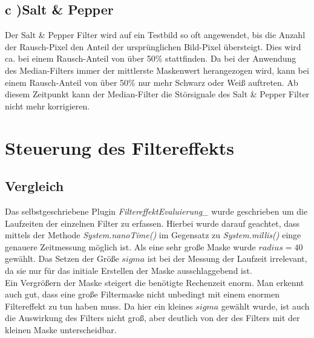 \documentclass[12pt,german]{article}
\begin{document}
\subsection{c )Salt \& Pepper}
Der Salt \& Pepper Filter wird auf ein Testbild so oft angewendet, bis die Anzahl der Rausch-Pixel den Anteil der ursprünglichen Bild-Pixel übersteigt. Dies wird ca. bei einem Rausch-Anteil von über 50\% stattfinden. Da bei der Anwendung des Median-Filters immer der mittlerste Maskenwert herangezogen wird, kann bei einem Rausch-Anteil von über 50\% nur mehr Schwarz oder Weiß auftreten. Ab diesem Zeitpunkt kann der Median-Filter die Störsignale des Salt \& Pepper Filter nicht mehr korrigieren.



\newpage
\section{Steuerung des Filtereffekts }

\subsection{Vergleich}
Das selbstgeschriebene Plugin \textit{FiltereffektEvaluierung\_} wurde geschrieben um die Laufzeiten der einzelnen Filter zu erfassen. Hierbei wurde darauf geachtet, dass mittels der Methode \textit{System.nanoTime()} im Gegensatz zu \textit{System.millis()} einge genauere Zeitmessung möglich ist. Als eine sehr große Maske wurde $  radius = 40 $ gewählt. Das Setzen der Größe $ sigma $ ist bei der Messung der Laufzeit irrelevant, da sie nur für das initiale Erstellen der Maske ausschlaggebend ist. \\

Ein Vergrößern der Maske steigert die benötigte Rechenzeit enorm. Man erkennt auch gut, dass eine große Filtermaske nicht unbedingt mit einem enormen Filtereffekt zu tun haben muss. Da hier ein kleines $sigma$ gewählt wurde, ist auch die Auswirkung des Filters nicht groß, aber deutlich von der des Filters mit der kleinen Maske unterscheidbar.
\end{document}
